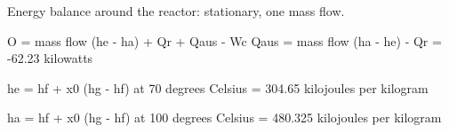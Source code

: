 Energy balance around the reactor: stationary, one mass flow.

O = mass flow (he - ha) + Qr + Qaus - Wc
Qaus = mass flow (ha - he) - Qr
= -62.23 kilowatts

he = hf + x0 (hg - hf) at 70 degrees Celsius
= 304.65 kilojoules per kilogram

ha = hf + x0 (hg - hf) at 100 degrees Celsius
= 480.325 kilojoules per kilogram